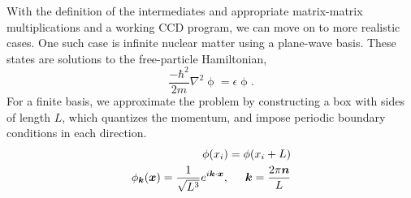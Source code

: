 With the definition of the intermediates and appropriate matrix-matrix multiplications and  a working CCD program, we can move on to more
  realistic cases. One such case is infinite nuclear matter using a
  plane-wave basis. These states are solutions to the free-particle
  Hamiltonian,
  \begin{equation}
  \frac{-\hbar^2}{2m}\nabla^2\mathop{\phi(\vec{x})}=\epsilon\mathop{\phi(\vec{x})}.
  \end{equation}
  For a finite basis, we approximate the problem by constructing a box
  with sides of length $L$, which quantizes the momentum, and impose
  periodic boundary conditions in each direction.
  \begin{align}
  \mathop{\phi(x_{i})}=\mathop{\phi(x_{i}+L)}
  \\ \mathop{\phi_{\vec{k}}(\vec{x})}=\frac{1}{\sqrt{L^{3}}}e^{i\vec{k}\cdot\vec{x}},\hspace{0.5cm}\vec{k}=\frac{2\pi\vec{n}}{L}
  \end{align}

